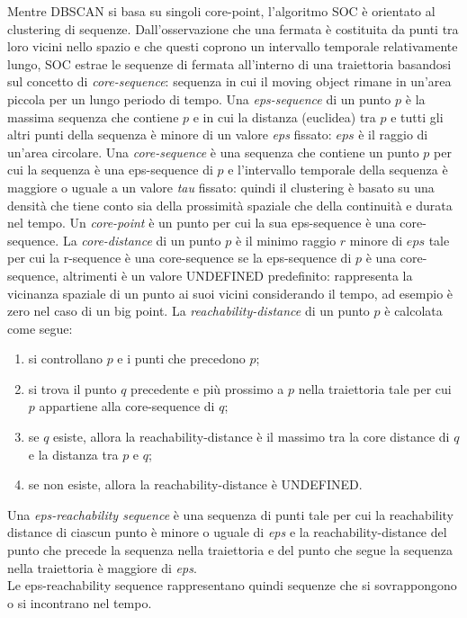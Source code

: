 \documentclass[12pt]{article}
\begin{document}
Mentre DBSCAN si basa su singoli core-point, l'algoritmo SOC è orientato al clustering di sequenze.
Dall'osservazione che una fermata è costituita da punti tra loro vicini nello spazio e che questi coprono un intervallo temporale relativamente lungo, SOC estrae le sequenze di fermata all'interno di una traiettoria basandosi sul concetto di \emph{core-sequence}: sequenza in cui il moving object rimane in un'area piccola per un lungo periodo di tempo.
Una \emph{eps-sequence} di un punto $p$ è la massima sequenza che contiene $p$ e in cui la distanza (euclidea) tra $p$ e tutti gli altri punti della sequenza è minore di un valore \emph{eps} fissato: $eps$ è il raggio di un'area circolare.
Una \emph{core-sequence} è una sequenza che contiene un punto $p$ per cui la sequenza è una eps-sequence di $p$ e l'intervallo temporale della sequenza è maggiore o uguale a un valore \emph{tau} fissato: quindi il clustering è basato su una densità che tiene conto sia della prossimità spaziale che della continuità e durata nel tempo.
Un \emph{core-point} è un punto per cui la sua eps-sequence è una core-sequence.
La \emph{core-distance} di un punto $p$ è il minimo raggio $r$ minore di $eps$ tale per cui la r-sequence è una core-sequence se la eps-sequence di $p$ è una core-sequence, altrimenti è un valore UNDEFINED predefinito: rappresenta la vicinanza spaziale di un punto ai suoi vicini considerando il tempo, ad esempio è zero nel caso di un big point.
La \emph{reachability-distance} di un punto $p$ è calcolata come segue:
\begin{enumerate}
    \item si controllano $p$ e i punti che precedono $p$;
    \item si trova il punto $q$ precedente e più prossimo a $p$ nella traiettoria tale per cui $p$ appartiene alla core-sequence di $q$;
    \item se $q$ esiste, allora la reachability-distance è il massimo tra la core distance di $q$ e la distanza tra $p$ e $q$;
    \item se non esiste, allora la reachability-distance è UNDEFINED.
\end{enumerate}
Una \emph{eps-reachability sequence} è una sequenza di punti tale per cui la reachability distance di ciascun punto è minore o uguale di \emph{eps} e la reachability-distance del punto che precede la sequenza nella traiettoria e del punto che segue la sequenza nella traiettoria è maggiore di \emph{eps}.\\
Le eps-reachability sequence rappresentano quindi sequenze che si sovrappongono o si incontrano nel tempo.
\end{document}
